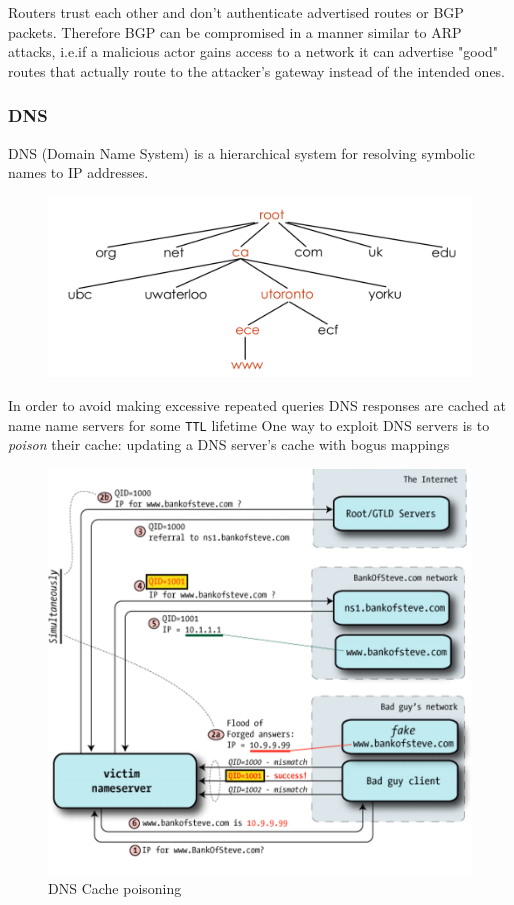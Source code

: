 \documentclass[../notes.tex]{subfiles}
\begin{document}
Routers trust each other and don't authenticate advertised routes or BGP packets.
Therefore BGP can be compromised in a manner similar to ARP attacks, i.e.if a malicious actor gains access to a network it can advertise "good" routes that actually route to the attacker's gateway instead of the intended ones.


\subsubsection{DNS}


\begin{definition}
    DNS (Domain Name System) is a hierarchical system for resolving symbolic names to IP addresses.

    \begin{figure}[H]
        \centering
        \includegraphics[width=0.8\linewidth]{img/image_2023-03-29-15-00-01.png}
    \end{figure}
\end{definition}

In order to avoid making excessive repeated queries DNS responses are cached at name name servers for some \texttt{TTL} lifetime
One way to exploit DNS servers is to \textit{poison} their cache: updating a DNS server's cache with bogus mappings



\begin{figure}[H]
    \centering
    \includegraphics[width=0.8\linewidth]{img/image_2023-03-30-03-15-39.png}
    \caption{DNS Cache poisoning}
\end{figure}
\end{document}

